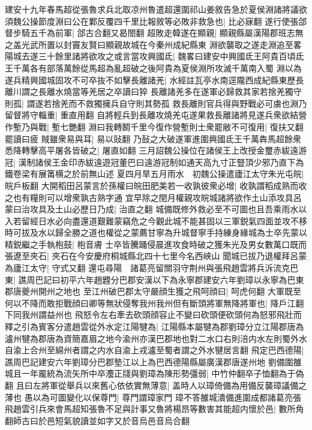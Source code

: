 建安十九年春馬超從張魯求兵北取凉州魯遣超還圍祁山姜敘告急於夏侯淵諸將議欲須魏公操節度淵曰公在鄴反覆四千里比報敘等必敗非救急也|{
	比必寐翻}
遂行使張郃督步騎五千為前軍|{
	郃古合翻又曷閤翻}
超敗走韓遂在顯親|{
	顯親縣屬漢陽郡班志無之盖光武所置以封竇友賢曰顯親故城在今秦州成紀縣東}
淵欲襲取之遂走淵追至畧陽城去遂三十餘里諸將欲攻之或言當攻興國氐|{
	魏畧曰建安中興國氐王阿貴百頃氐王千萬各有部落萬餘從馬超為亂超破之後阿貴為夏侯淵所攻滅千萬南入蜀}
淵以為遂兵精興國城固攻不可卒抜不如擊長離諸羌|{
	水經註瓦亭水南逕隴西成紀縣東歷長離川謂之長離水燒當等羌居之卒讀曰猝}
長離諸羌多在遂軍必歸救其家若捨羌獨守則孤|{
	謂遂若捨羌而不救獨擁兵自守則其勢孤}
救長離則官兵得與野戰必可虜也淵乃留督將守輜重|{
	重直用翻}
自將輕兵到長離攻燒羌屯遂果救長離諸將見遂兵衆欲結營作塹乃與戰|{
	塹七艷翻}
淵曰我轉鬭千里今復作營塹則士衆罷敝不可復用|{
	復扶又翻罷讀曰疲}
賊雖衆易與耳|{
	易以䜴翻}
乃鼔之大破遂軍進圍興國氐王千萬犇馬超餘衆悉降轉擊高平屠各皆破之|{
	屠直如翻}
三月詔魏公操位在諸侯王上改授金璽赤紱遠游冠|{
	漢制諸侯王金印赤紱遠遊冠董巴曰遠游冠制如通天高九寸正豎頂少邪乃直下為鐵卷梁有展筩横之於前無山述}
夏四月旱五月雨水　初魏公操遣廬江太守朱光屯皖|{
	皖戶板翻}
大開稻田呂蒙言於孫權曰皖田肥美若一收孰彼衆必增|{
	收孰謂稻成熟而收之也有糧則可以增衆孰古熟字通}
宜早除之閏月權親攻皖城諸將欲作土山添攻具呂蒙曰治攻具及土山必歷日乃成|{
	治直之翻}
城備既修外救必至不可圖也且吾乘雨水以入若留經日水必向盡還道艱難蒙竊危之今觀此城不能甚固以三軍鋭氣四面並攻不移時可拔及水以歸全勝之道也權從之蒙薦甘寧為升城督寧手持練身緣城為士卒先蒙以精鋭繼之手執枹鼓|{
	枹音膚}
士卒皆騰踊侵晨進攻食時破之獲朱光及男女數萬口既而張遼至夾石|{
	夾石在今安慶府桐城縣北四十七里今名西峽山}
聞城已拔乃退權拜呂蒙為廬江太守|{
	守式又翻}
還屯尋陽　諸葛亮留關羽守荆州與張飛趙雲將兵泝流克巴東|{
	譙周巴記曰初平六年趙韙分巴郡安漢以下為永寧郡建安六年劉璋以永寧為巴東郡唐夔州開州之地也}
至江州破巴郡太守嚴顔生獲之飛呵顔曰|{
	呵虎何翻}
大軍既至何以不降而敢拒戰顔曰卿等無狀侵奪我州我州但有斷頭將軍無降將軍也|{
	降戶江翻下同我州謂益州也}
飛怒令左右牽去砍頭顔容止不變曰砍頭便砍頭何為怒邪飛壯而釋之引為賓客分遣趙雲從外水定江陽犍為|{
	江陽縣本屬犍為郡劉璋分立江陽郡唐為瀘州犍為郡唐為資簡嘉眉之地今渝州亦漢巴郡地也對二水口右則涪内水左則蜀外水自渝上合州至綿州者謂之内水自渝上戎瀘至蜀者謂之外水犍居言翻}
飛定巴西德陽|{
	譙周巴記建安六年劉璋分巴郡墊江以上為巴西德陽縣屬廣漢郡唐遂州地}
劉備圍雒城且一年龎統為流矢所中卒灋正牋與劉璋為陳形勢彊弱|{
	中竹仲翻卒子恤翻為于偽翻}
且曰左將軍從舉兵以來舊心依依實無薄意|{
	盖時人以璋倚備為用備反襲璋議備之薄也}
愚以為可圖變化以保尊門|{
	尊門謂璋家門}
璋不答雒城潰備進圍成都諸葛亮張飛趙雲引兵來會馬超知張魯不足與計事又魯將楊昂等數害其能超内懷於邑|{
	數所角翻師古曰於邑短氣貌讀並如字又於音烏邑音烏合翻}

